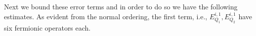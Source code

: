 \documentclass[sn-mathphys, Numbered ,a4paper]{sn-jnl}%
\DeclareMathOperator{\Z}{\mathbb{Z}}
\theoremstyle{plain}
\theoremstyle{definition}
\theoremstyle{remark}
\theoremstyle{plain}
\theoremstyle{definition}
\theoremstyle{remark}
\begin{document}
\begin{comment}
		&+ 2a^*_{q-\ell_1}[b_{-s}(-\ell),b^*_{-s_1}(-\ell_1)]a_{q-\ell}-\delta_{-s_1+\ell_1,q-\ell} a^*_{q-\ell_1}a^*_{-s_1}b_{-s}(-\ell)\nonumber\\
		&+ 2\delta_{-s_1+\ell_1,q-\ell}\delta_{s,s_1}a^*_{q-\ell_1}a_{-s+\ell} - 2\delta_{-s+\ell,q-\ell_1}b^*_{-s_1}(-\ell_1)a_{-s}a_{q-\ell} \nonumber\\
		&-2\delta_{-s+\ell,q-\ell_1}\delta_{s,s_1}a^*_{-s_1+\ell_1} a_{q-\ell} + \delta_{-s_1+\ell_1,q-\ell}\delta_{-s+\ell,q-\ell_1}a^*_{-s_1}a_{-s} \nonumber\\
		&+ \big\{ [b_{-s}(-\ell),a^*_{q-\ell_1}],[a^*_{q-\ell}, b_{-s_1}(-\ell_1)]^*\big\} \Big) 
	\end{aligned}\nonumber\\
	&+\sum\limits_{\ell, \ell_1\in \Z^3_*}\!\quad\sum\limits_{\substack{s \in L_{\ell}\\     s_1 \in L_{\ell_1}}} \begin{aligned}[t]\, \mathds{1}_{L_\ell}&       (q) \mathds{1}_{(L_{\ell_1}-\ell_1+\ell)}(q) K^{m}_{q,s}(\ell) K_{q-\ell+\ell_1,s_1}        (\ell_1) \Big(4a^*_{q-\ell+\ell_1}b^*_{-s_1}(-\ell_1)b_{-s}(-\ell)a_{q}       \nonumber\\ 
		&+ 2a^*_{q-\ell+\ell_1}[b_{-s}(-\ell),b^*_{-s_1}(-\ell_1)]a_{q}+ \delta_{-s_1, q}a^*_{q-\ell+\ell_1}a^*_{-s_1+\ell_1}b_{-s}(-\ell) \nonumber\\
		&+ 2\delta_{-s_1,q}\delta_{s-\ell,s_1-\ell_1}a^*_{q-\ell+\ell_1}a_{-s} + 2\delta_{-s,q-\ell+\ell_1}b^*_{-s_1}(-\ell_1)a_{-s+\ell}a_{q} \nonumber\\
		&-2\delta_{-s,q-\ell+\ell_1}\delta_{-s+\ell,-s_1+\ell_1}a^*_{-s_1}a_{q} + \delta_{-s_1,q}\delta_{-s,q-\ell+\ell_1}a^*_{-s_1+\ell_1}a_{-s+\ell} \nonumber\\
		&+ \big\{ [b_{-s}(-\ell),a^*_{q-\ell+\ell_1}],[a^*_{q}, b_{-s_1}(-\ell_1)]^*\big\} \Big)
	\end{aligned}\nonumber\\
	&+\mathrm{h.c.} + (q\rightarrow-q)\nonumber\\
	&-\sum\limits_{\ell \in \Z^3_*}\sum\limits_{r,s \in L_{\ell}}\Theta^{m+1}_K(P^q)_{r,s}\epsilon_{r,s}(\ell,\ell)
	\equalscolon \sum\limits_{i=1}^{6}\sum\limits_{j=1}^{8} E_{Q_2}^{\,i,j}\nonumber + E_{Q_2}^{\, 7}.
\end{alignat}


\end{comment}


 Next we bound these error terms and in order to do so we have the following estimates. As evident from the normal ordering, the first term, i.e.,  $E_{Q_1}^{i,1}, E_{Q_2}^{i,1}$ have six fermionic operators each. %
\end{document}
